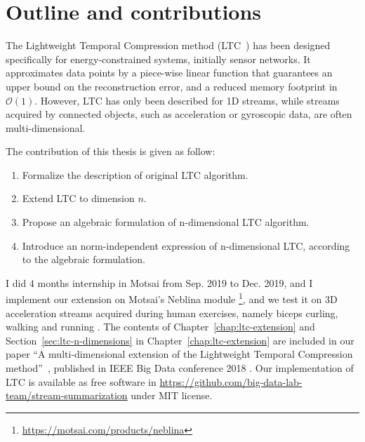 \section{Outline and contributions}


The Lightweight Temporal Compression method
(LTC~\cite{schoellhammer2004lightweight}) has been designed  specifically for
energy-constrained systems, initially sensor networks.  It approximates data
points by a piece-wise linear function that  guarantees an upper bound on the
reconstruction error, and a reduced  memory footprint in $\mathcal{O}(1)$.
However, LTC has only been  described for 1D streams, while streams acquired by
connected objects, such as  acceleration or gyroscopic data, are often
multi-dimensional. 



The contribution of this thesis is given as follow:
\begin{enumerate}
  \item Formalize the description of original LTC algorithm.
  \item Extend LTC to dimension $n$.
  \item Propose an algebraic formulation of n-dimensional LTC algorithm.
  \item Introduce an norm-independent expression of n-dimensional LTC, according
  to the algebraic formulation.
\end{enumerate}


I did 4 months internship in Motsai from Sep. 2019 to Dec. 2019, and I implement
our extension on Motsai's Neblina module
\footnote{\url{https://motsai.com/products/neblina}}, and we test it on 3D
acceleration streams acquired during human exercises, namely biceps curling,
walking and running .
 The contents of Chapter~\ref{chap:ltc-extension} and
Section~\ref{sec:ltc-n-dimensions} in Chapter~\ref{chap:ltc-extension} are
included in our paper ``A multi-dimensional extension of the Lightweight
Temporal Compression method''~\cite{li2018multi}, published in IEEE Big Data
conference 2018 . Our implementation of LTC is available as free software in
\url{https://github.com/big-data-lab-team/stream-summarization} under MIT
license.



